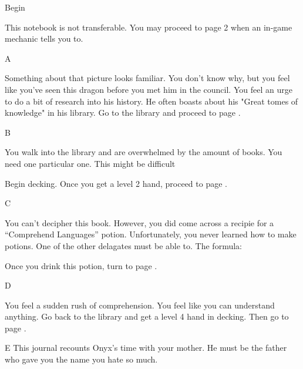 \documentclass[notebook]{GuildCamp2}
\begin{document}
\startnotebook{\nRedDragon{}}



\begin{page}{Begin}

This notebook is not transferable. You may proceed to page 2 when an in-game mechanic tells you to.
\end{page}



\begin{page}{A}


Something about that picture looks familiar. You don't know why, but you feel like you've seen this dragon before you met him in the council. You feel an urge to do a bit of research into his history. He often boasts about his "Great tomes of knowledge" in his library. Go to the library and proceed to page .

\end{page}



\begin{page}{B}

You walk into the library and are overwhelmed by the amount of books. You need one particular one. This might be difficult

Begin decking. Once you get a level 2 hand, proceed to page .

\end{page}


\begin{page}{C}

You can't decipher this book. However, you did come across a recipie for a ``Comprehend Languages'' potion. Unfortunately, you never learned how to make potions. One of the other delagates must be able to. 
The formula: 

\begin{enum}
	\item \iCFungus{}
	\item \iSeedoftheWorldTree{}
\end{enum}

Once you drink this potion, turn to page .

\end{page}


\begin{page}{D}

You feel a sudden rush of comprehension. You feel like you can understand anything. Go back to the library and get a level 4 hand in decking. Then go to page . 

\end{page}


\begin{page}{E}
This journal recounts Onyx's time with your mother. He must be the father who gave you the name you hate so much.


\end{page}



\endnotebook{\nRedDragon{}}
\end{document}
